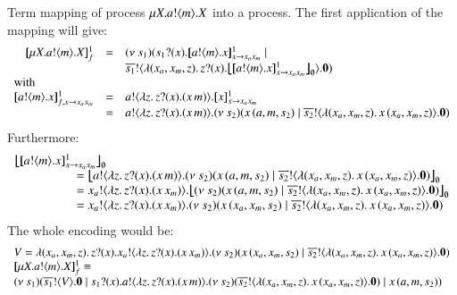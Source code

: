 \begin{example}

 Term mapping of \HOp process $\mu X. a ! \langle m \rangle . X$
into a \HO process. The first application of the mapping
will give:
%
\[
\begin{array}{rcl}
	\pmapp{\recp{X}{\bout{a}{m} \varp{X}}}{1}{f} &=&
	\newsp{s_1}{ \binp{s_1}{x} \pmapp{\bout{a}{m} \varp{x}}{1}{\varp{x} \rightarrow x_ax_m} \Par\\
	&&\bout{\dual{s_1}}{ \abs{(x_a, x_m, z)} \binp{z}{x} \auxmap{\pmapp{\bout{a}{m} \varp{x}}{1}{\varp{x} \rightarrow x_ax_m}}{\es} } \inact}
	\\
	\multicolumn{3}{l}{\textrm{with}}
	\\
	\pmapp{\bout{a}{m} \varp{x}}{1}{f, \varp{x} \rightarrow x_ax_m} &=&
	\bout{a}{\abs{z}{\binp{z}{x} (\appl{x}{m})}} \pmapp{\varp{x}}{1}{\varp{x} \rightarrow x_ax_m}
	\\
	&=& \bout{a}{\abs{z}{\binp{z}{x} (\appl{x}{m})}} \newsp{s_2}{\appl{x}{(a,m, s_2)}  \Par \bout{\dual{s_2}}{\abs{(x_a, x_m, z)}{\appl{x}{(x_a, x_m, z)}}} \inact}
\end{array}
\]
%
\noi Furthermore:
%
\[
\begin{array}{l}
	\auxmap{\pmapp{\bout{a}{m} \varp{x}}{1}{\varp{x} \rightarrow x_ax_m}}{\es}\\
	\qquad \qquad \quad = \auxmap{\bout{a}{\abs{z}{\binp{z}{x} (\appl{x}{m})}} \newsp{s_2}{\appl{x}{(a,m, s_2)}  \Par \bout{\dual{s_2}}{\abs{(x_a, x_m, z)}{\appl{x}{(x_a, x_m, z)}}} \inact}}{\es}
	\\
	\qquad \qquad \quad = \bout{x_a}{\abs{z}{\binp{z}{x} (\appl{x}{x_m})}} \auxmap{\newsp{s_2}{\appl{x}{(a,m, s_2)}  \Par \bout{\dual{s_2}}{\abs{(x_a, x_m, z)}{\appl{x}{(x_a, x_m, z)}}} \inact}}{\es}
	\\
	\qquad \qquad \quad = \bout{x_a}{\abs{z}{\binp{z}{x} (\appl{x}{x_m})}} \newsp{s_2}{\appl{x}{(x_a,x_m, s_2)}  \Par \bout{\dual{s_2}}{\abs{(x_a, x_m, z)}{\appl{x}{(x_a, x_m, z)}}} \inact}
\end{array}
\]
%
\noi The whole encoding would be:
%
\[
\begin{array}{l}
	V = \abs{(x_a, x_m, z)} \binp{z}{x} \bout{x_a}{\abs{z}{\binp{z}{x} (\appl{x}{x_m})}} \newsp{s_2}{\appl{x}{(x_a,x_m, s_2)}  \Par \bout{\dual{s_2}}{\abs{(x_a, x_m, z)}{\appl{x}{(x_a, x_m, z)}}} \inact}\\
	\pmapp{\recp{X}{\bout{a}{m} \varp{X}}}{1}{f} \scong \\
	\newsp{s_1}{\bout{\dual{s_1}}{V} \inact \Par \binp{s_1}{x} \bout{a}{\abs{z}{\binp{z}{x} (\appl{x}{m})}} \newsp{s_2}{\bout{\dual{s_2}}{\abs{(x_a, x_m, z)}{\appl{x}{(x_a, x_m, z)}}} \inact} \Par \appl{x}{(a,m, s_2)}}
\end{array}
\]


\end{example}
